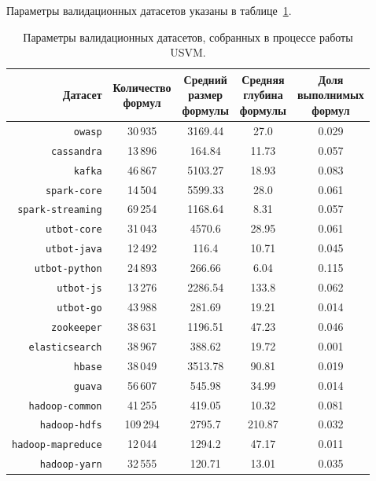 Параметры валидационных датасетов указаны в таблице~\ref{usvm-val-datasets-table}.

\begin{table}[ht]
\begin{center}
\begin{tabular}{r|cccc}
    Датасет & \makecell{Количество \\ формул} & \makecell{Средний \\ размер \\ формулы} & \makecell{Средняя \\ глубина \\ формулы} & \makecell{Доля \\ выполнимых \\ формул} \\
    \hline \hline
    \rule{0pt}{2.5ex}
    \texttt{owasp} & 30\,935 & 3169.44 & 27.0 & 0.029 \\
    \texttt{cassandra} & 13\,896 & 164.84 & 11.73 & 0.057 \\
    \texttt{kafka} & 46\,867 & 5103.27 & 18.93 & 0.083 \\
    \texttt{spark-core} & 14\,504 & 5599.33 & 28.0 & 0.061 \\
    \texttt{spark-streaming} & 69\,254 & 1168.64 & 8.31 & 0.057 \\
    \texttt{utbot-core} & 31\,043 & 4570.6 & 28.95 & 0.061 \\
    \texttt{utbot-java} & 12\,492 & 116.4 & 10.71 & 0.045 \\
    \texttt{utbot-python} & 24\,893 & 266.66 & 6.04 & 0.115 \\
    \texttt{utbot-js} & 13\,276 & 2286.54 & 133.8 & 0.062 \\
    \texttt{utbot-go} & 43\,988 & 281.69 & 19.21 & 0.014 \\
    \texttt{zookeeper} & 38\,631 & 1196.51 & 47.23 & 0.046 \\
    \texttt{elasticsearch} & 38\,967 & 388.62 & 19.72 & 0.001 \\
    \texttt{hbase} & 38\,049 & 3513.78 & 90.81 & 0.019 \\
    \texttt{guava} & 56\,607 & 545.98 & 34.99 & 0.014 \\
    \texttt{hadoop-common} & 41\,255 & 419.05 & 10.32 & 0.081 \\
    \texttt{hadoop-hdfs} & 109\,294 & 2795.7 & 210.87 & 0.032 \\
    \texttt{hadoop-mapreduce} & 12\,044 & 1294.2 & 47.17 & 0.011 \\
    \texttt{hadoop-yarn} & 32\,555 & 120.71 & 13.01 & 0.035 \\
\end{tabular}
\caption{\label{usvm-val-datasets-table} Параметры валидационных датасетов, собранных в процессе работы USVM.}
\end{center}
\end{table}

